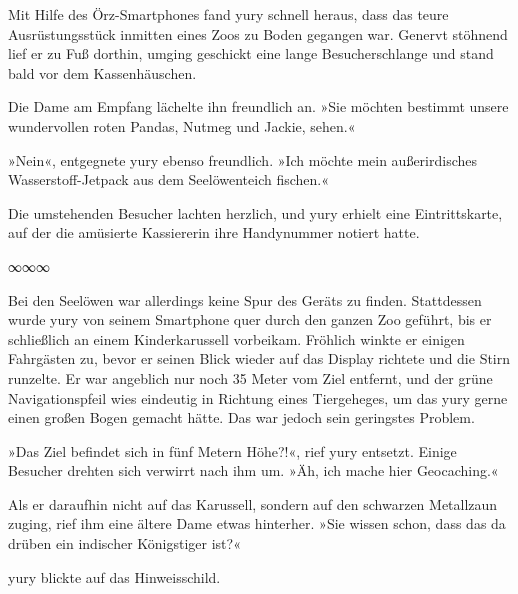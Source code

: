 Mit Hilfe des Örz-Smartphones fand yury schnell heraus, dass das teure Ausrüstungsstück inmitten eines Zoos zu Boden gegangen war. Genervt stöhnend lief er zu Fuß dorthin, umging geschickt eine lange Besucherschlange und stand bald vor dem Kassenhäuschen.

Die Dame am Empfang lächelte ihn freundlich an. »Sie möchten bestimmt unsere wundervollen roten Pandas, Nutmeg und Jackie, sehen.«

»Nein«, entgegnete yury ebenso freundlich. »Ich möchte mein außerirdisches Wasserstoff-Jetpack aus dem Seelöwenteich fischen.«

Die umstehenden Besucher lachten herzlich, und yury erhielt eine Eintrittskarte, auf der die amüsierte Kassiererin ihre Handynummer notiert hatte.

\begin{center}
∞∞∞
\end{center}

Bei den Seelöwen war allerdings keine Spur des Geräts zu finden. Stattdessen wurde yury von seinem Smartphone quer durch den ganzen Zoo geführt, bis er schließlich an einem Kinderkarussell vorbeikam. Fröhlich winkte er einigen Fahrgästen zu, bevor er seinen Blick wieder auf das Display richtete und die Stirn runzelte. Er war angeblich nur noch 35 Meter vom Ziel entfernt, und der grüne Navigationspfeil wies eindeutig in Richtung eines Tiergeheges, um das yury gerne einen großen Bogen gemacht hätte. Das war jedoch sein geringstes Problem.

»Das Ziel befindet sich in fünf Metern Höhe?!«, rief yury entsetzt. Einige Besucher drehten sich verwirrt nach ihm um. »Äh, ich mache hier Geocaching.«

Als er daraufhin nicht auf das Karussell, sondern auf den schwarzen Metallzaun zuging, rief ihm eine ältere Dame etwas hinterher. »Sie wissen schon, dass das da drüben ein indischer Königstiger ist?«

yury blickte auf das Hinweisschild.


